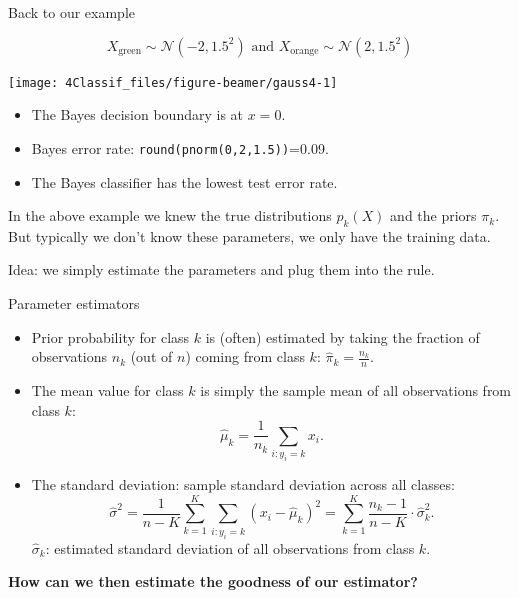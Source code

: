 \documentclass[10pt,ignorenonframetext,]{beamer}
\begin{document}
\begin{frame}[fragile]

\begin{block}{Back to our example}

\[X_{\text{green}}\sim \mathcal{N}(-2, 1.5^2) \text{ and }
X_{\text{orange}}\sim \mathcal{N}(2, 1.5^2) \]

\begin{center}\texttt{[image: 4Classif\_files/figure-beamer/gauss4-1]} \end{center}

\begin{itemize}
\item
  The Bayes decision boundary is at \(x=0\).
\item
  Bayes error rate: \texttt{round(pnorm(0,2,1.5))}=0.09.
\item
  The Bayes classifier has the lowest test error rate.
\end{itemize}

\end{block}

\end{frame}

\begin{frame}

\vspace{2mm}

In the above example we knew the true distributions \(p_k(X)\) and the
priors \(\pi_k\). But typically we don't know these parameters, we only
have the training data.

Idea: we simply estimate the parameters and plug them into the rule.

\end{frame}

\begin{frame}

\begin{block}{Parameter estimators}

\vspace{2mm}

\begin{itemize}
\item
  Prior probability for class \(k\) is (often) estimated by taking the
  fraction of observations \(n_k\) (out of \(n\)) coming from class
  \(k\): \(\hat{\pi}_k = \frac{n_k}{n}.\)
\item
  The mean value for class \(k\) is simply the sample mean of all
  observations from class \(k\):
  \[\hat{\mu}_k = \frac{1}{n_k}\sum_{i:y_i=k} x_i.\]
\item
  The standard deviation: sample standard deviation across all classes:
  \[\hat{\sigma}^2=\frac{1}{n-K}\sum_{k=1}^K \sum_{i: y_i=k} (x_i-\hat{\mu}_k)^2 = \sum_{k=1}^K \frac{n_k - 1}{n - K} \cdot \hat{\sigma}_k^2.\]
  \(\hat{\sigma}_k\): estimated standard deviation of all observations
  from class \(k\).
\end{itemize}

\textbf{How can we then estimate the goodness of our estimator?}

\end{block}

\end{frame}
\end{document}
